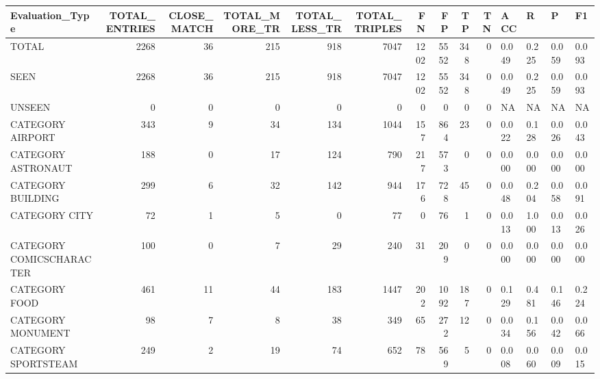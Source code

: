 \begin{tabular}{lrrrrrrrrrllll}
\hline
 Evaluation\_Type          &   TOTAL\_ENTRIES &   CLOSE\_MATCH &   TOTAL\_MORE\_TR &   TOTAL\_LESS\_TR &   TOTAL\_TRIPLES &   FN &   FP &   TP &   TN & ACC   & R     & P     & F1    \\
\hline
 TOTAL                    &            2268 &            36 &             215 &             918 &            7047 & 1202 & 5552 &  348 &    0 & 0.049 & 0.225 & 0.059 & 0.093 \\
 SEEN                     &            2268 &            36 &             215 &             918 &            7047 & 1202 & 5552 &  348 &    0 & 0.049 & 0.225 & 0.059 & 0.093 \\
 UNSEEN                   &               0 &             0 &               0 &               0 &               0 &    0 &    0 &    0 &    0 & NA    & NA    & NA    & NA    \\
 CATEGORY AIRPORT         &             343 &             9 &              34 &             134 &            1044 &  157 &  864 &   23 &    0 & 0.022 & 0.128 & 0.026 & 0.043 \\
 CATEGORY ASTRONAUT       &             188 &             0 &              17 &             124 &             790 &  217 &  573 &    0 &    0 & 0.000 & 0.000 & 0.000 & 0.000 \\
 CATEGORY BUILDING        &             299 &             6 &              32 &             142 &             944 &  176 &  728 &   45 &    0 & 0.048 & 0.204 & 0.058 & 0.091 \\
 CATEGORY CITY            &              72 &             1 &               5 &               0 &              77 &    0 &   76 &    1 &    0 & 0.013 & 1.000 & 0.013 & 0.026 \\
 CATEGORY COMICSCHARACTER &             100 &             0 &               7 &              29 &             240 &   31 &  209 &    0 &    0 & 0.000 & 0.000 & 0.000 & 0.000 \\
 CATEGORY FOOD            &             461 &            11 &              44 &             183 &            1447 &  202 & 1092 &  187 &    0 & 0.129 & 0.481 & 0.146 & 0.224 \\
 CATEGORY MONUMENT        &              98 &             7 &               8 &              38 &             349 &   65 &  272 &   12 &    0 & 0.034 & 0.156 & 0.042 & 0.066 \\
 CATEGORY SPORTSTEAM      &             249 &             2 &              19 &              74 &             652 &   78 &  569 &    5 &    0 & 0.008 & 0.060 & 0.009 & 0.015 \\

\end{tabular}
